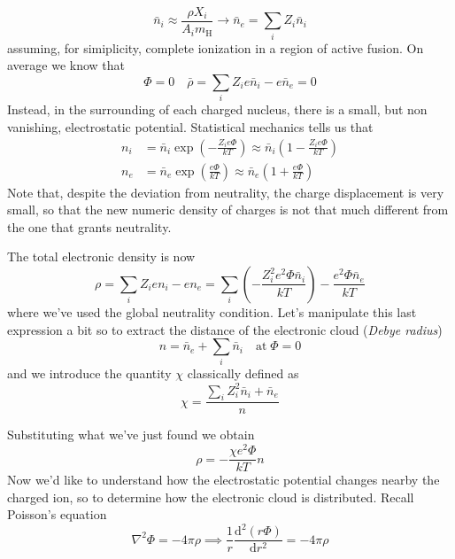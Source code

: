 \begin{equation*}
    \bar{n}_{i}\approx \frac{\rho X_{i}}{A_{i}m_{\text{H}}} \to \bar{n}_{e} = \sum_{i}Z_{i}\bar{n}_{i}
\end{equation*}
assuming, for simiplicity, complete ionization in a region of active fusion. On average we know that 
\begin{equation*}
    \Phi = 0 \quad \bar{\rho} = \sum_{i}Z_{i}e\bar{n}_{i}-e\bar{n}_{e}= 0
\end{equation*}
Instead, in the surrounding of each charged nucleus, there is a small, but non vanishing, electrostatic potential. Statistical mechanics tells us that
\begin{align*}
    n_{i} &= \bar{n}_{i}\exp\left(-\frac{Z_{i}e\Phi}{kT}\right) \approx \bar{n}_{i}\left(1-\frac{Z_{i}e\Phi}{kT}\right)\\
    n_{e} &= \bar{n}_{e}\exp\left(\frac{e\Phi}{kT}\right) \approx \bar{n}_{e}\left(1+\frac{e\Phi}{kT}\right)
\end{align*}
Note that, despite the deviation from neutrality, the charge displacement is very small, so that the new numeric density of charges is not that much different from the one that grants neutrality.
\par The total electronic density is now 
\begin{equation*}
    \rho = \sum_{i}Z_{i}e n_{i}-en_{e} = \sum_{i}\left(-\frac{Z_{i}^{2}e^{2}\Phi\bar{n}_{i}}{kT}\right)-\frac{e^{2}\Phi\bar{n}_{e}}{kT}
\end{equation*}
where we've used the global neutrality condition. Let's manipulate this last expression a bit so to extract the distance of the electronic cloud (\emph{Debye radius})
\begin{equation*}
    n = \bar{n}_{e} + \sum_{i}\bar{n}_{i} \quad \text{at}\; \Phi = 0
\end{equation*}
and we introduce the quantity $\chi$ classically defined as 
\begin{equation*}
    \chi = \frac{\sum_{i}Z_{i}^{2}\bar{n}_{i}+\bar{n}_{e}}{n}
\end{equation*}
\par Substituting what we've just found we obtain
\begin{equation*}
    \rho = -\frac{\chi e^{2}\Phi}{kT}n
\end{equation*}
Now we'd like to understand how the electrostatic potential changes nearby the charged ion, so to determine how the electronic cloud is distributed. Recall Poisson's equation
\begin{equation*}
    \nabla^{2}\Phi = -4\pi\rho \implies \frac{1}{r}\frac{\text{d}^{2}(r\Phi)}{\text{d}r^{2}} = -4\pi\rho
\end{equation*}
